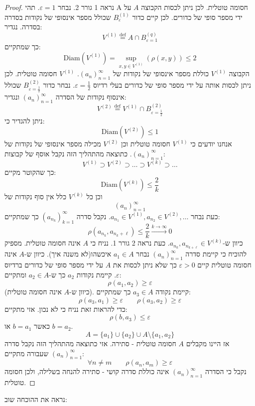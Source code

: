 \documentclass{tstextbook}
\begin{document}
\begin{proof}
נראה 1 גורר 2. נבחר \(\varepsilon=1\). תהי A חסומה טוטלית. לכן ניתן לכסות הקבוצה \(A\) על ידי מספר סופי של כדורים.
לכן קיים כדור \(B_{\varepsilon}^{(1)}\) שכולל מספר אינסופי של נקודות בסדרה בסדרה. נגדיר:
$$V^{(1)}\overset{\text{def}}{=} A\cap  B_{\varepsilon=1}^{(q)} $$
כך שמתקיים:
$$\mathrm{Diam}(V^{(1)})=\sup _{x,y \in V^{(1)}}(\rho(x,y))\leq  2$$
הקבוצה \(V^{(1)}\) כוללת מספר אינסופי של נקודות של \((a_{n})^{\infty}_{n=1}\). \(V^{(1)}\) חסומה טוטלית. לכן ניתן לכסות אותה על ידי מספר סופי של כדורים בעלי רדיוס \(\varepsilon = \frac{1}{2}\). נבחר כדור \(B^{(2)}_{\varepsilon=\frac{1}{2}}\) שכולל אינסוף נקודות של הסדרה \((a_{n})_{n=1}^{\infty}\) ונגדיר:
$$V^{(2)}\overset{\text{def}}{=} V^{(1)}\cap  B_{\varepsilon=\frac{1}{2}}^{(2)}$$
ניתן להגדיר כי:
$$\mathrm{Diam}(V^{(2)})\leq  1$$
אנחנו יודעים כי \(V^{(1)}\) חסומה טוטלית וכן \(V^{(2)}\) מכילה מספר אינסופי של נקודות של \((a_{n})_{n=1}^{\infty}\).
כתוצאה מהתהליך הזה נקבל אוסף של קבוצות:
$$V^{(1)}\supset V^{(2)}\supset \dots \supset V^{(k)}\supset \dots$$
כך שהקוטר מקיים:
$$\text{Diam}(V^{(k)})\leq  \frac{2}{k}$$
וכן כל \(V^{(k)}\) כלל אין סוף נקודות של $$(a_{n})_{n=1}^{\infty}$$ כעת נבחר \(a_{n_{1}}\in V^{(1)},a_{n_{2}}\in V^{(2)},\dots\). נקבל סדרה \((a_{n_{k}})_{k=1}^{\infty}\) כך שמתקיים:
$$\rho(a_{n_{k}}, a_{n_{k}+\ell})\leq \frac{2}{k}\xrightarrow{k\to \infty} 0$$
כיוון ש-\(a_{n_{k}},a_{n_{k+\ell}}\in V^{(k)}\).
כעת נראה 2 גורר 1. נניח כי \(A\) אינה חסומה טוטלית. מספיק להוכיח כי קיימת סדרה \((a_{n})^{\infty}_{n=1}\) נבחר \(a_{1}\in A\) איכשהו(לא משנה איך). כיוון ש-\(A\) אינה חסומה טוטלית קיים \(\varepsilon>0\) כך שלא ניתן לכסות את \(A\) על ידי מספר סופי של כדורים ברדיוס \(\varepsilon\). קיימת נקודות \(a_{2}\) כך ש-\(a_{2}\in A\) ומתקיים:
$$\rho(a_{1},a_{2})\geq  \varepsilon$$
(כיוון ש-\(A\) אינה חסומה טוטלית). קיימת נקודה \(a_{3}\in A\) כך שמתקיים:
$$\rho(a_{3},a_{1})\geq \varepsilon \qquad \rho(a_{3},a_{2})\geq \varepsilon$$
כדי להראות זאת נניח כי לא נכון. אזי מתקיים:
$$\rho(b,a_{3})\leq  \varepsilon$$
כאשר \(b=a_{1}\) או \(b=a_{2}\). 
$$A=\{ a_{1} \}\cup  \{ a_{2} \}\cup A\setminus \{ a_{1},a_{2} \}$$
אז היינו מקבלים \(A\) חסומה טוטלית - סתירה.
אזי כתוצאה מהתהליך הזה נקבל סדרה \((a_{n})_{n=1}^{\infty}\) שעבורה מתקיים:
$$\forall n\neq m \qquad \rho(a_{n},a_{m})\geq \varepsilon$$
נקבל כי הסדרה \((a_{n})_{n=1}^{\infty}\) אינה כוללת סדרה קושי - סתירה להנחה בשלילה, ולכן חסומה טוטלית.

\end{proof}
נראה את ההוכחה שוב:
\end{document}
